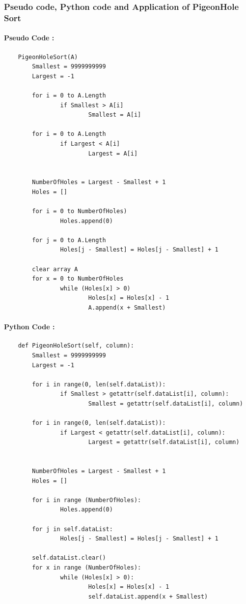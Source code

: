 \documentclass[12pt]{article}
\begin{document}
    \newpage
    \subsubsection{Pseudo code, Python code and Application of PigeonHole Sort}
    \paragraph{Pseudo Code :}
    \begin{verbatim}
    PigeonHoleSort(A)
        Smallest = 9999999999
        Largest = -1

        for i = 0 to A.Length
                if Smallest > A[i]
                        Smallest = A[i]

        for i = 0 to A.Length
                if Largest < A[i]
                        Largest = A[i]

        
        NumberOfHoles = Largest - Smallest + 1
        Holes = []

        for i = 0 to NumberOfHoles)
                Holes.append(0)

        for j = 0 to A.Length
                Holes[j - Smallest] = Holes[j - Smallest] + 1

        clear array A
        for x = 0 to NumberOfHoles
                while (Holes[x] > 0)
                        Holes[x] = Holes[x] - 1
                        A.append(x + Smallest)
    \end{verbatim}
    \paragraph{Python Code :}
    \begin{verbatim}
    def PigeonHoleSort(self, column):
        Smallest = 9999999999
        Largest = -1

        for i in range(0, len(self.dataList)):
                if Smallest > getattr(self.dataList[i], column):
                        Smallest = getattr(self.dataList[i], column)

        for i in range(0, len(self.dataList)):
                if Largest < getattr(self.dataList[i], column):
                        Largest = getattr(self.dataList[i], column)

        
        NumberOfHoles = Largest - Smallest + 1
        Holes = []

        for i in range (NumberOfHoles):
                Holes.append(0)

        for j in self.dataList:
                Holes[j - Smallest] = Holes[j - Smallest] + 1

        self.dataList.clear()
        for x in range (NumberOfHoles):
                while (Holes[x] > 0):
                        Holes[x] = Holes[x] - 1
                        self.dataList.append(x + Smallest)
    \end{verbatim}
\end{document}
